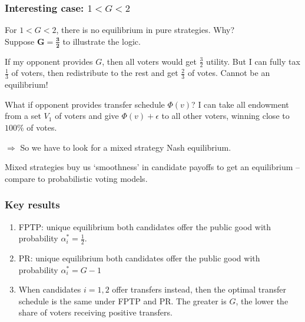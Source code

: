\documentclass[11pt,aspectratio=169]{beamer}
\begin{document}
\begin{frame}
\frametitle{Interesting case: $1<G<2$}

For $1<G<2$, there is no equilibrium in pure strategies. \alert{Why?} \\

Suppose $\mathbf{G = \frac{3}{2}}$ to illustrate the logic.

\begin{outline}
\1 If my opponent provides $G$, then all voters would get $\frac{3}{2}$ utility.
\2 But I can fully tax $\frac{1}{3}$ of voters, then redistribute to the rest and get $\frac{2}{3}$ of votes. Cannot be an equilibrium!

\1 What if opponent provides transfer schedule $\Phi(v)$?
\2 I can take all endowment from a set $V_1$ of voters and give $\Phi(v)+\epsilon$ to all other voters, winning close to $100\%$ of votes.
\end{outline}

\bigskip

$\Rightarrow$ So we have to look for a mixed strategy Nash equilibrium. 

\bigskip 

Mixed strategies buy us `smoothness' in candidate payoffs to get an equilibrium -- compare to probabilistic voting models.

\end{frame}

\begin{frame}
\frametitle{Key results}

\begin{enumerate}
\item FPTP: unique equilibrium both candidates offer the public good with probability $\alpha_i^* = \frac{1}{2}$. 
\item PR: unique equilibrium both candidates offer the public good with probability  $\alpha_i^* = G - 1$ 
\item When candidates $i=1,2$ offer transfers instead, then the optimal transfer schedule is the same under FPTP and PR. The greater is $G$, the lower the share of voters receiving positive transfers.
\end{enumerate}

\end{frame}
\end{document}
